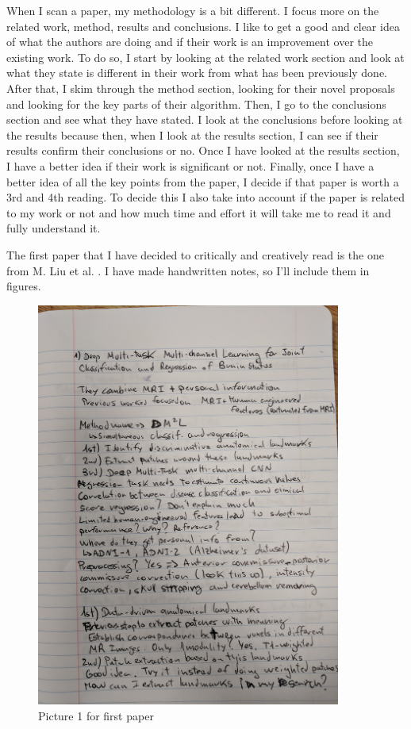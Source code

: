 \documentclass{article}
\begin{document}
When I scan a paper, my methodology is a bit different. I focus more on the related work, method, results and conclusions. I like to get a good and clear idea of what the authors are doing and if their work is an improvement over the existing work. To do so, I start by looking at the related work section and look at what they state is different in their work from what has been previously done. After that, I skim through the method section, looking for their novel proposals and looking for the key parts of their algorithm. Then, I go to the conclusions section and see what they have stated. I look at the conclusions before looking at the results because then, when I look at the results section, I can see if their results confirm their conclusions or no. Once I have looked at the results section, I have a better idea if their work is significant or not. Finally, once I have a better idea of all the key points from the paper, I decide if that paper is worth a 3rd and 4th reading. To decide this I also take into account if the paper is related to my work or not and how much time and effort it will take me to read it and fully understand it.


The first paper that I have decided to critically and creatively read is the one from M. Liu et al. \cite{10.1007/978-3-319-66179-7_1}. I have made handwritten notes, so I'll include them in figures.

\begin{figure}[h]
\centering
\includegraphics[width=10cm]{paper1_1.jpg}
\caption{Picture 1 for first paper}
\label{fig:paper1_1}
\end{figure}
\end{document}
